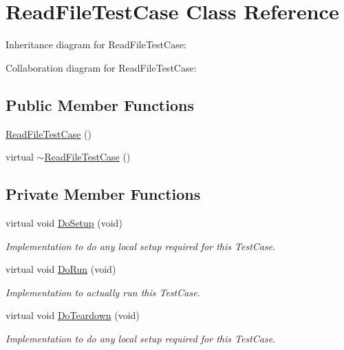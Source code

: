 \hypertarget{classReadFileTestCase}{}\section{Read\+File\+Test\+Case Class Reference}
\label{classReadFileTestCase}


Inheritance diagram for Read\+File\+Test\+Case\+:


Collaboration diagram for Read\+File\+Test\+Case\+:
\subsection*{Public Member Functions}
\begin{DoxyCompactItemize}
\item 
\hyperlink{classReadFileTestCase_a6917a41b33509dfe20266521ba83f0e9}{Read\+File\+Test\+Case} ()
\item 
virtual \hyperlink{classReadFileTestCase_a77dd3163f6ac735ecf8d6e001e3595cc}{$\sim$\+Read\+File\+Test\+Case} ()
\end{DoxyCompactItemize}
\subsection*{Private Member Functions}
\begin{DoxyCompactItemize}
\item 
virtual void \hyperlink{classReadFileTestCase_aab1bba48f8545df2db564a7c6d7a226e}{Do\+Setup} (void)
\begin{DoxyCompactList}\small\item\em Implementation to do any local setup required for this Test\+Case. \end{DoxyCompactList}\item 
virtual void \hyperlink{classReadFileTestCase_a45c51f52ea608037fd8b5ca3a5353ad9}{Do\+Run} (void)
\begin{DoxyCompactList}\small\item\em Implementation to actually run this Test\+Case. \end{DoxyCompactList}\item 
virtual void \hyperlink{classReadFileTestCase_a7843d24440cabc331d749359bf2b3d80}{Do\+Teardown} (void)
\begin{DoxyCompactList}\small\item\em Implementation to do any local setup required for this Test\+Case. \end{DoxyCompactList}\end{DoxyCompactItemize}
